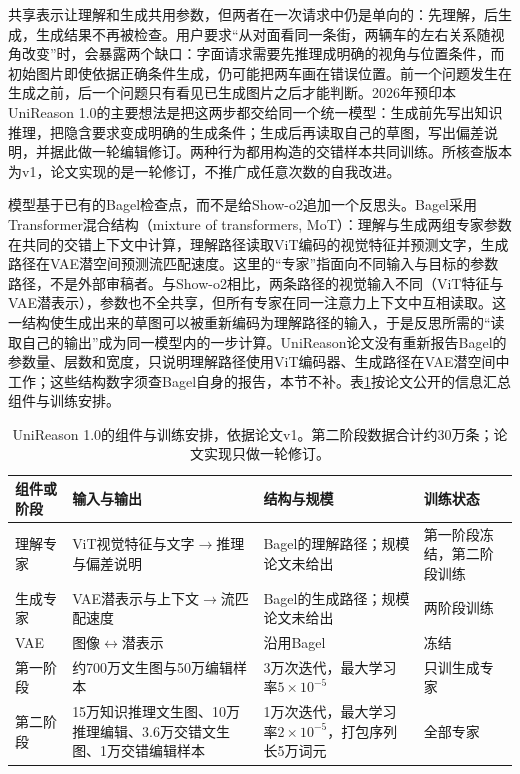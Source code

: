 共享表示让理解和生成共用参数，但两者在一次请求中仍是单向的：先理解，后生成，生成结果不再被检查。用户要求“从对面看同一条街，两辆车的左右关系随视角改变”时，会暴露两个缺口：字面请求需要先推理成明确的视角与位置条件，而初始图片即使依据正确条件生成，仍可能把两车画在错误位置。前一个问题发生在生成之前，后一个问题只有看见已生成图片之后才能判断。2026年预印本UniReason 1.0的主要想法是把这两步都交给同一个统一模型：生成前先写出知识推理，把隐含要求变成明确的生成条件；生成后再读取自己的草图，写出偏差说明，并据此做一轮编辑修订。两种行为都用构造的交错样本共同训练。所核查版本为v1，论文实现的是一轮修订，不推广成任意次数的自我改进。

模型基于已有的Bagel检查点，而不是给Show-o2追加一个反思头。Bagel采用Transformer混合结构（mixture of transformers, MoT）：理解与生成两组专家参数在共同的交错上下文中计算，理解路径读取ViT编码的视觉特征并预测文字，生成路径在VAE潜空间预测流匹配速度。这里的“专家”指面向不同输入与目标的参数路径，不是外部审稿者。与Show-o2相比，两条路径的视觉输入不同（ViT特征与VAE潜表示），参数也不全共享，但所有专家在同一注意力上下文中互相读取。这一结构使生成出来的草图可以被重新编码为理解路径的输入，于是反思所需的“读取自己的输出”成为同一模型内的一步计算。UniReason论文没有重新报告Bagel的参数量、层数和宽度，只说明理解路径使用ViT编码器、生成路径在VAE潜空间中工作；这些结构数字须查Bagel自身的报告，本节不补。表\ref{tab:vision-models-unireason-config}按论文公开的信息汇总组件与训练安排。

\begin{table}[htbp]
  \centering
  \small
  \begin{tabularx}{\linewidth}{@{}p{14mm}XXp{18mm}@{}}
    \toprule
    组件或阶段 & 输入与输出 & 结构与规模 & 训练状态\\
    \midrule
    理解专家 & ViT视觉特征与文字$\to$推理与偏差说明 & Bagel的理解路径；规模论文未给出 & 第一阶段冻结，第二阶段训练\\
    生成专家 & VAE潜表示与上下文$\to$流匹配速度 & Bagel的生成路径；规模论文未给出 & 两阶段训练\\
    VAE & 图像$\leftrightarrow$潜表示 & 沿用Bagel & 冻结\\
    第一阶段 & 约700万文生图与50万编辑样本 & 3万次迭代，最大学习率$5\times10^{-5}$ & 只训生成专家\\
    第二阶段 & 15万知识推理文生图、10万推理编辑、3.6万交错文生图、1万交错编辑样本 & 1万次迭代，最大学习率$2\times10^{-5}$，打包序列长5万词元 & 全部专家\\
    \bottomrule
  \end{tabularx}
  \caption{UniReason 1.0的组件与训练安排，依据论文v1。第二阶段数据合计约30万条；论文实现只做一轮修订。}
  \label{tab:vision-models-unireason-config}
\end{table}

